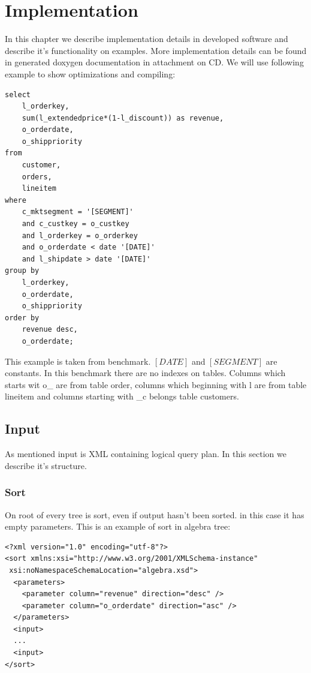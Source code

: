 \chapter{Implementation}

In this chapter we describe implementation details in developed software and describe it's functionality on examples. More implementation details can be found in generated doxygen\cite{doxygen} documentation in attachment on CD. We will use following example to show optimizations and compiling:


\begin{verbatim}
select
    l_orderkey,
    sum(l_extendedprice*(1-l_discount)) as revenue,
    o_orderdate,
    o_shippriority
from
    customer,
    orders,
    lineitem
where
    c_mktsegment = '[SEGMENT]'
    and c_custkey = o_custkey
    and l_orderkey = o_orderkey
    and o_orderdate < date '[DATE]'
    and l_shipdate > date '[DATE]'
group by
    l_orderkey,
    o_orderdate,
    o_shippriority
order by
    revenue desc,
    o_orderdate;
\end{verbatim}

This example is taken from benchmark\cite{benchmark}. $[DATE]$ and $[SEGMENT]$ are constants. In this benchmark there are no indexes on tables. Columns which starts wit o\_ are from table order, columns which beginning with l\- are from table lineitem and columns starting with \_c belongs table customers.



\section{Input}

As mentioned input is XML containing logical query plan. In this section we describe it's structure. 

\subsection{Sort}

On root of every tree is sort, even if output hasn't been sorted. in this case it has empty parameters. This is an example of sort in algebra tree:


\begin{lstlisting}
<?xml version="1.0" encoding="utf-8"?>
<sort xmlns:xsi="http://www.w3.org/2001/XMLSchema-instance"
 xsi:noNamespaceSchemaLocation="algebra.xsd">
  <parameters>
    <parameter column="revenue" direction="desc" />
    <parameter column="o_orderdate" direction="asc" />
  </parameters>
  <input>
  ...
  <input>
</sort>
\end{lstlisting}

